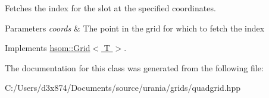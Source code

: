 \-Fetches the index for the slot at the specified coordinates. 


\begin{DoxyParams}{\-Parameters}
{\em coords} & \-The point in the grid for which to fetch the index \\
\hline
\end{DoxyParams}


\-Implements \hyperlink{classhsom_1_1_grid_a1c3162ea843ab3f7e79136425e011a5d}{hsom\-::\-Grid$<$ T $>$}.



\-The documentation for this class was generated from the following file\-:\begin{DoxyCompactItemize}
\item 
\-C\-:/\-Users/d3x874/\-Documents/source/urania/grids/quadgrid.\-hpp\end{DoxyCompactItemize}
